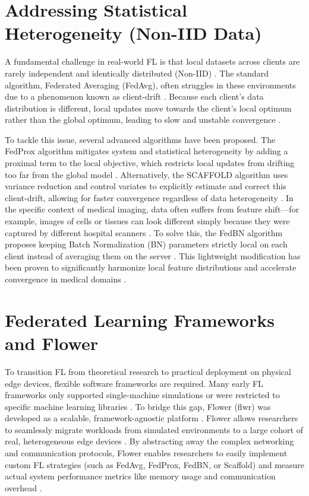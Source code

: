 \section{Addressing Statistical Heterogeneity (Non-IID Data)}
A fundamental challenge in real-world FL is that local datasets across clients are rarely independent and identically distributed (Non-IID) \cite{jimenez2024noniid}. The standard algorithm, Federated Averaging (FedAvg), often struggles in these environments due to a phenomenon known as client-drift \cite{karimireddy2020scaffold}. Because each client's data distribution is different, local updates move towards the client's local optimum rather than the global optimum, leading to slow and unstable convergence \cite{karimireddy2020scaffold}.

To tackle this issue, several advanced algorithms have been proposed. The FedProx algorithm mitigates system and statistical heterogeneity by adding a proximal term to the local objective, which restricts local updates from drifting too far from the global model \cite{li2020federated}. Alternatively, the SCAFFOLD algorithm uses variance reduction and control variates to explicitly estimate and correct this client-drift, allowing for faster convergence regardless of data heterogeneity \cite{karimireddy2020scaffold}. In the specific context of medical imaging, data often suffers from feature shift—for example, images of cells or tissues can look different simply because they were captured by different hospital scanners \cite{li2021fedbn}. To solve this, the FedBN algorithm proposes keeping Batch Normalization (BN) parameters strictly local on each client instead of averaging them on the server \cite{li2021fedbn}. This lightweight modification has been proven to significantly harmonize local feature distributions and accelerate convergence in medical domains \cite{li2021fedbn}.

\section{Federated Learning Frameworks and Flower}
To transition FL from theoretical research to practical deployment on physical edge devices, flexible software frameworks are required. Many early FL frameworks only supported single-machine simulations or were restricted to specific machine learning libraries \cite{beutel2020flower}. To bridge this gap, Flower (flwr) was developed as a scalable, framework-agnostic platform \cite{beutel2020flower}. Flower allows researchers to seamlessly migrate workloads from simulated environments to a large cohort of real, heterogeneous edge devices \cite{beutel2020flower}. By abstracting away the complex networking and communication protocols, Flower enables researchers to easily implement custom FL strategies (such as FedAvg, FedProx, FedBN, or Scaffold) and measure actual system performance metrics like memory usage and communication overhead \cite{beutel2020flower}.

